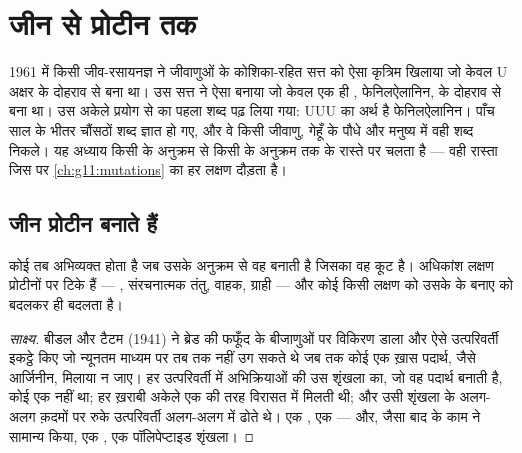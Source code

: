 \chapter{जीन से प्रोटीन तक}\label{ch:g11:gene-expression}

1961 में किसी जीव-रसायनज्ञ ने जीवाणुओं के कोशिका-रहित सत्त को ऐसा कृत्रिम
 खिलाया जो केवल U अक्षर के दोहराव से बना था। उस सत्त ने ऐसा 
बनाया जो केवल एक ही , फेनिलऐलानिन, के दोहराव से बना था। उस
अकेले प्रयोग से  का पहला शब्द पढ़ लिया गया: UUU का अर्थ है
फेनिलऐलानिन। पाँच साल के भीतर चौंसठों शब्द ज्ञात हो गए, और वे किसी
जीवाणु, गेहूँ के पौधे और मनुष्य में वही शब्द निकले। यह अध्याय किसी  के
 अनुक्रम से किसी  के  अनुक्रम तक के रास्ते
पर चलता है --- वही रास्ता जिस पर \cref{ch:g11:mutations} का हर लक्षण
दौड़ता है।

\section{जीन प्रोटीन बनाते हैं}

\begin{proposition}[एक जीन, एक प्रोटीन]\label{prop:g11:gene-expression:onegene}
कोई  तब अभिव्यक्त होता है जब  उसके अनुक्रम से वह  बनाती है
जिसका वह कूट है। अधिकांश लक्षण प्रोटीनों पर टिके हैं --- , संरचनात्मक
तंतु, वाहक, ग्राही --- और कोई  किसी लक्षण को उसके  के बनाए
 को बदलकर ही बदलता है।
\end{proposition}
\begin{proof}[साक्ष्य]
बीडल और टैटम (1941) ने ब्रेड की फफूँद के बीजाणुओं पर विकिरण डाला और ऐसे
उत्परिवर्ती इकट्ठे किए जो न्यूनतम माध्यम पर तब तक नहीं उग सकते थे जब तक
कोई एक ख़ास पदार्थ, जैसे  आर्जिनीन, मिलाया न जाए। हर उत्परिवर्ती
में अभिक्रियाओं की उस शृंखला का, जो वह पदार्थ बनाती है, कोई एक  नहीं
था; हर ख़राबी अकेले एक  की तरह विरासत में मिलती थी; और उसी शृंखला के
अलग-अलग क़दमों पर रुके उत्परिवर्ती अलग-अलग  में  ढोते थे।
एक , एक  --- और, जैसा बाद के काम ने सामान्य किया, एक , एक
पॉलिपेप्टाइड शृंखला।
\end{proof}

